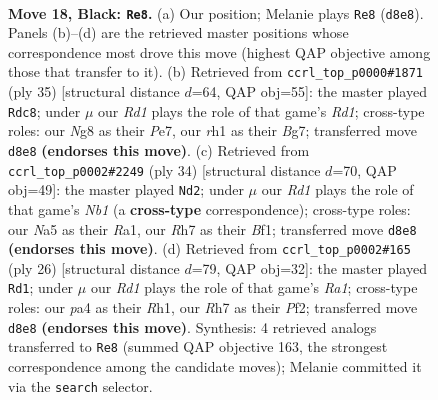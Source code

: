 \documentclass[11pt]{article}
\begin{document}
\begin{figure}[p]\centering
\begin{subfigure}{0.46\textwidth}\centering
\resizebox{\linewidth}{!}{%
\newchessgame
\chessboard[
  setfen={2kr1bn1/pp1b3r/4p1p1/nP1pP1Pp/P2P4/4KN2/5P2/RNB2B1R b - - 0 18},
  showmover=false,
  pgfstyle=straightmove, color=movearrow, markmove={d8-e8}
]}
\caption{}
\end{subfigure}\hfill
\begin{subfigure}{0.46\textwidth}\centering
\resizebox{\linewidth}{!}{%
\newchessgame
\chessboard[
  setfen={r2r2k1/3nppbp/6p1/pp1p1b2/3P4/1PB1PNP1/1P3PBP/R1R3K1 b - - 0 18},
  showmover=false,
  pgfstyle=straightmove, color=movearrow, markmove={d8-c8}
]}
\caption{}
\end{subfigure}
\\[4pt]
\begin{subfigure}{0.46\textwidth}\centering
\resizebox{\linewidth}{!}{%
\newchessgame
\chessboard[
  setfen={r1n1kb1r/1p3pp1/p3pnp1/B2p4/3P2P1/1P2PK1P/1P3P2/RN3B1R w kq - 0 18},
  showmover=false,
  pgfstyle=straightmove, color=movearrow, markmove={b1-d2}
]}
\caption{}
\end{subfigure}\hfill
\begin{subfigure}{0.46\textwidth}\centering
\resizebox{\linewidth}{!}{%
\newchessgame
\chessboard[
  setfen={r1b1k2r/1p3ppp/2p2nn1/4p3/p1P1P3/P1N1B3/1P3PPP/R3KB1R w KQkq - 0 14},
  showmover=false,
  pgfstyle=straightmove, color=movearrow, markmove={a1-d1}
]}
\caption{}
\end{subfigure}
\caption{\textbf{Move 18, Black: \texttt{Re8}.} (a) Our position; Melanie plays \texttt{Re8} (\texttt{d8e8}). Panels (b)--(d) are the retrieved master positions whose correspondence most drove this move (highest QAP objective among those that transfer to it). (b) Retrieved from \texttt{ccrl\_top\_p0000\#1871} (ply 35) [structural distance $d$=64, QAP obj=55]: the master played \texttt{Rdc8}; under $\mu$ our \emph{Rd1} plays the role of that game's \emph{Rd1}; cross-type roles: our \emph{N}g8 as their \emph{P}e7, our \emph{r}h1 as their \emph{B}g7; transferred move \texttt{d8e8} \textbf{(endorses this move)}. (c) Retrieved from \texttt{ccrl\_top\_p0002\#2249} (ply 34) [structural distance $d$=70, QAP obj=49]: the master played \texttt{Nd2}; under $\mu$ our \emph{Rd1} plays the role of that game's \emph{Nb1} (a \textbf{cross-type} correspondence); cross-type roles: our \emph{N}a5 as their \emph{R}a1, our \emph{R}h7 as their \emph{B}f1; transferred move \texttt{d8e8} \textbf{(endorses this move)}. (d) Retrieved from \texttt{ccrl\_top\_p0002\#165} (ply 26) [structural distance $d$=79, QAP obj=32]: the master played \texttt{Rd1}; under $\mu$ our \emph{Rd1} plays the role of that game's \emph{Ra1}; cross-type roles: our \emph{p}a4 as their \emph{R}h1, our \emph{R}h7 as their \emph{P}f2; transferred move \texttt{d8e8} \textbf{(endorses this move)}. Synthesis: 4 retrieved analogs transferred to \texttt{Re8} (summed QAP objective 163, the strongest correspondence among the candidate moves); Melanie committed it via the \texttt{search} selector.}
\label{fig:thought-m35}
\end{figure}
\end{document}
